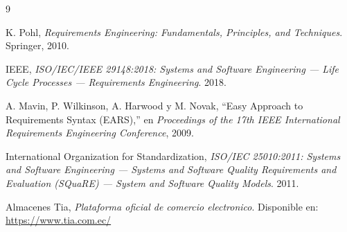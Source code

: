 \documentclass[11pt,a4paper]{article}
\begin{document}
\begin{thebibliography}{9}

K. Pohl,
\textit{Requirements Engineering: Fundamentals,
Principles, and Techniques}.
Springer, 2010.

IEEE,
\textit{ISO/IEC/IEEE 29148:2018:
Systems and Software Engineering ---
Life Cycle Processes --- Requirements Engineering}.
2018.

A. Mavin, P. Wilkinson, A. Harwood y M. Novak,
``Easy Approach to Requirements Syntax (EARS),''
en \textit{Proceedings of the 17th IEEE International
Requirements Engineering Conference}, 2009.

International Organization for Standardization,
\textit{ISO/IEC 25010:2011:
Systems and Software Engineering ---
Systems and Software Quality Requirements
and Evaluation (SQuaRE) --- System and Software
Quality Models}.
2011.

Almacenes Tia,
\textit{Plataforma oficial de comercio electronico}.
Disponible en:
\url{https://www.tia.com.ec/}

\end{thebibliography}
\end{document}
